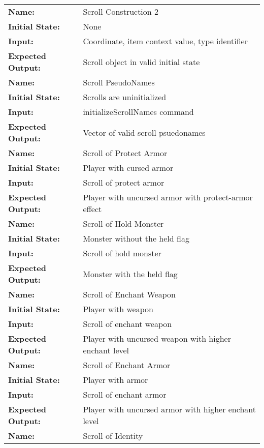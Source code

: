 \documentclass[12pt, titlepage]{article}
\begin{document}
\begin{center}
\begin{longtable}{ l | p{10cm} }
				\hline
				\rule{0pt}{1.5em}\textbf{Name:} & Scroll Construction 2\\
				\textbf{Initial State:} & None\\
				\textbf{Input:} & Coordinate, item context value, type identifier\\
				\textbf{Expected Output:} & Scroll object in valid initial state\\[0.6em]
				\hline
				\rule{0pt}{1.5em}\textbf{Name:} & Scroll PseudoNames\\
				\textbf{Initial State:} & Scrolls are uninitialized\\
				\textbf{Input:} & initializeScrollNames command\\
				\textbf{Expected Output:} & Vector of valid scroll psuedonames\\[0.6em]
				\hline
				\rule{0pt}{1.5em}\textbf{Name:} & Scroll of Protect Armor\\
				\textbf{Initial State:} & Player with cursed armor \\
				\textbf{Input:} & Scroll of protect armor\\
				\textbf{Expected Output:} & Player with uncursed armor with protect-armor effect\\[0.6em]
				\hline
				\rule{0pt}{1.5em}\textbf{Name:} & Scroll of Hold Monster\\
				\textbf{Initial State:} & Monster without the held flag\\
				\textbf{Input:} & Scroll of hold monster\\
				\textbf{Expected Output:} & Monster with the held flag\\[0.6em]
				\hline
				\rule{0pt}{1.5em}\textbf{Name:} & Scroll of Enchant Weapon\\
				\textbf{Initial State:} & Player with weapon\\
				\textbf{Input:} & Scroll of enchant weapon\\
				\textbf{Expected Output:} & Player with uncursed weapon with higher enchant level\\[0.6em]
				\hline
				\rule{0pt}{1.5em}\textbf{Name:} & Scroll of Enchant Armor\\
				\textbf{Initial State:} & Player with armor\\
				\textbf{Input:} & Scroll of enchant armor\\
				\textbf{Expected Output:} & Player with uncursed armor with higher enchant level\\[0.6em]
				\hline
				\rule{0pt}{1.5em}\textbf{Name:} & Scroll of Identity\\

\end{longtable}
\end{center}
\end{document}
